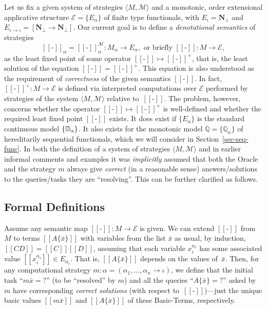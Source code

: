 \documentclass[fleqn]{LMCS}
\theoremstyle{plain}\newtheorem{satz}[thm]{Satz}
\theoremstyle{plain}\newtheorem{hyp}[thm]{Hypothesis}
\theoremstyle{plain}\newtheorem{hyps}[thm]{Hypotheses}
\theoremstyle{definition}\newtheorem{note}[thm]{Note}
\newcommand{\EE}{\mathcal{E}}
\newcommand{\defis}{\mbox{-}}
\newcommand{\setof}[1]{\{#1\}}
\newcommand{\arr}{\rightarrow}
\newcommand{\la}{\langle}
\newcommand{\ra}{\rangle}
\newcommand{\Dsem}[1]{[\![ #1 ]\!]}
\newcommand{\tuple}[1]{\la #1 \ra}
\newcommand{\NN}{\mathbf{N}}
\newcommand{\bbQ}{\mathbb{Q}}
\newcommand{\Undef}{{\perp}}
\newcommand{\MM}{{\mathcal M}}
\newcommand{\bx}{\bar{x}}
\newcommand{\?}{\mbox{?}}
\begin{document}
\noindent
Let us fix a given system of strategies 
$\tuple{M,\MM}$ 
and a monotonic, order extensional applicative structure 
$\EE=\{E_\alpha\}$ of finite type functionals, with $E_{\iota}=\NN_{\Undef}$ 
and $E_{\iota\arr\iota}=[\NN_\Undef\arr\NN_\Undef]$. 
Our current goal is to define a \emph{denotational semantics} 
of strategies 
\[
\Dsem{\defis}_\alpha=\Dsem{\defis}^{\MM}_\alpha:M_\alpha \arr E_\alpha, 
\textrm{ or briefly } \Dsem{\defis}:M \arr \EE, 
\]
as the least fixed point of some operator 
$\Dsem{\defis}\mapsto\Dsem{\defis}^+$, that is, 
the least solution of the equation $\Dsem{\defis}=\Dsem{\defis}^+$. 
This equation is also understood as the requirement of 
\emph{correctness} of the given semantics 
$\Dsem{\defis}$. 
In fact, $\Dsem{\defis}^+:M\arr \EE$ is defined via 
interpreted computations over $\EE$ 
performed by strategies of the system 
$\tuple{M,\MM}$ relative to~$\Dsem{\defis}$. 
The problem, however, concerns whether the operator 
$\Dsem{\defis}\mapsto\Dsem{\defis}^+$ is well-defined and 
whether the required least fixed point $\Dsem{\defis}$ exists. 
It does exist if $\setof{E_\alpha}$ is the standard continuous model 
$\setof{\bbD_\alpha}$.
It also exists for 
the monotonic model $\bbQ=\setof{\bbQ_\alpha}$ of hereditarily 
sequential functionals, which we will 
consider in Section~\ref{sec-seq-func}. 
In both the definition of a system of strategies $\tuple{M,\MM}$ and in 
earlier informal comments and examples 
it was \emph{implicitly}
assumed that both the Oracle and the strategy $m$ always give {\em correct\/}
(in a reasonable sense) answers/solutions 
to the queries/tasks they are
``resolving''. 
This can be further clarified as follows.
\nopagebreak
\subsection{Formal Definitions}
\label{sec:seq-stra-den-sem-formal-def}


Assume any semantic map $\Dsem{\defis}:M\arr \EE$ is given. 
We can extend $\Dsem{\defis}$ from $M$ to terms $\Dsem{A\{\bx\}}$ 
with variables from the list $\bx$ 
as usual, by induction, 
$\Dsem{CD}=\Dsem{C}\Dsem{D}$, assuming that each variable $x_i^{\alpha_i}$ 
has some associated value $\Dsem{x_i^{\alpha_i}}\in E_{\alpha_i}$. 
That is, $\Dsem{A\{\bx\}}$ depends on the values of~$\bx$.
Then, for any computational strategy 
$m:\alpha=(\alpha_1,\ldots,\alpha_n\arr\iota)$, 
we define that the initial task ``$m\bx=\?$'' (to be ``resolved'' 
by $m$) and 
all the queries 
``$A\{\bx\}=\?$'' asked by $m$ have
corresponding \emph{correct solutions} 
(with respect to~$\Dsem{\defis}$)---just the unique basic values 
$\Dsem{m\bx}$ and $\Dsem{A\{\bx\}}$ 
of these \mbox{Basic-Terms}, respectively. 
\end{document}
